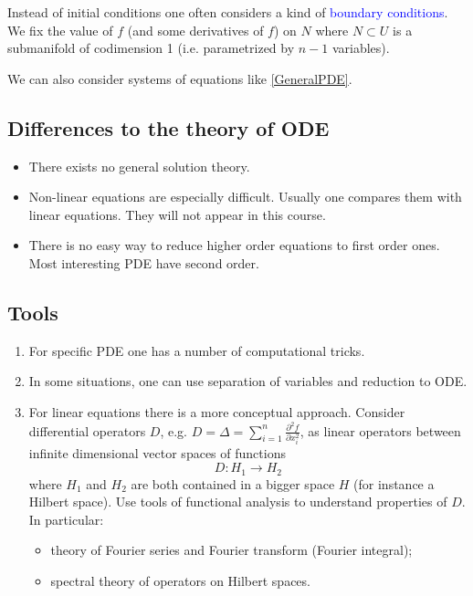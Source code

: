 \documentclass[12pt, oneside, a4paper]{article}
\theoremstyle{dfn}
\begin{document}
Instead of initial conditions one often considers a kind of \textcolor{blue}{boundary conditions}. We fix the value of $f$ (and some derivatives of $f$) on $N$ where $N \subset U$ is a submanifold of codimension 1 (i.e. parametrized by $n-1$ variables).

We can also consider systems of equations like \eqref{GeneralPDE}.

\subsection*{Differences to the theory of ODE}

\begin{itemize}
	\item There exists no general solution theory.
	\item Non-linear equations are especially difficult. Usually one compares them with linear equations. They will not appear in this course.
	\item There is no easy way to reduce higher order equations to first order ones. Most interesting PDE have second order.
\end{itemize}

\subsection*{Tools}

\begin{enumerate}
	\item For specific PDE one has a number of computational tricks.
	\item In some situations, one can use separation of variables and reduction to ODE.
	\item For linear equations there is a more conceptual approach.
Consider differential operators $D$, e.g. $D = \Delta = \sum_{i=1}^n \frac{\partial^2 f}{\partial x^2_i}$, as linear operators between infinite dimensional vector spaces of functions
\[
D: H_1 \to H_2
\]
where $H_1$ and $H_2$ are both contained in a bigger space $H$ (for instance a Hilbert space). Use tools of functional analysis to understand properties of $D$. In particular:
\begin{itemize}
	\item theory of Fourier series and Fourier transform (Fourier integral);
	\item spectral theory of operators on Hilbert spaces.
\end{itemize}
\end{enumerate}
\end{document}
